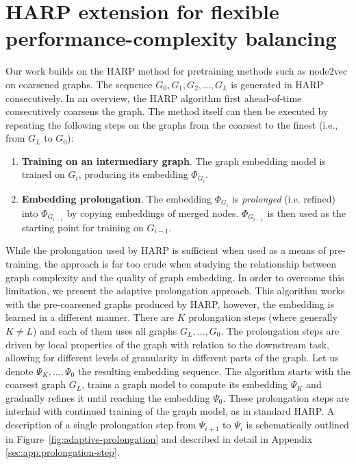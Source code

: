 \section{HARP extension for flexible performance-complexity balancing}\label{sec:our-method}

Our work builds on the HARP method \cite{chen_harp_2018} for pretraining methods such as node2vec \cite{grover_node2vec_2016} on coarsened graphs. The sequence \( G_0, G_1, G_2, \dots, G_L \) is generated in HARP consecutively. In an overview, the HARP algorithm first ahead-of-time consecutively coarsens the graph. The method itself can then be executed by repeating the following steps on the graphs from the coarsest to the finest (i.e., from \( G_L \) to \( G_0 \)):
\begin{enumerate}
  \item \textbf{Training on an intermediary graph}. The graph embedding model is trained on \( G_i \), producing its embedding \( \Phi_{G_i} \).
  \item \textbf{Embedding prolongation}. The embedding \( \Phi_{G_i} \) is \textit{prolonged} (i.e. refined) into \( \Phi_{G_{i - 1}} \) by copying embeddings of merged nodes. \( \Phi_{G_{i - 1}} \) is then used as the starting point for training on \( G_{i - 1} \).
\end{enumerate}

While the prolongation used by HARP is sufficient when used as a means of pre-training, the approach is far too crude when studying the relationship between graph complexity and the quality of graph embedding. In order to overcome this limitation, we present the adaptive prolongation approach. This algorithm works with the pre-coarsened graphs produced by HARP, however, the embedding is learned in a different manner. There are \( K \) prolongation steps (where generally \( K \neq L \)) and each of them uses all graphs \( G_L, \dots, G_0 \). The prolongation steps are driven by local properties of the graph with relation to the downstream task, allowing for different levels of granularity in different parts of the graph. Let us denote \( \Psi_K, \dots, \Psi_0 \) the resulting embedding sequence. The algorithm starts with the coarsest graph \( G_L \), trains a graph model to compute its embedding \( \Psi_K \) and gradually refines it until reaching the embedding \( \Psi_0 \). These prolongation steps are interlaid with continued training of the graph model, as in standard HARP. A description of a single prolongation step from \( \Psi_{i + 1} \) to \( \Psi_i \) is schematically outlined in Figure~\ref{fig:adaptive-prolongation} and described in detail in Appendix \ref{sec:app:prolongation-step}.

